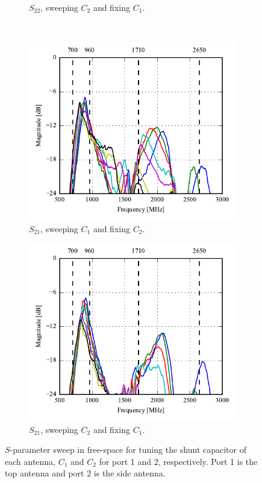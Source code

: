 \begin{figure}[htbp]
\begin{subfigure}[b]{0.49\linewidth}
        \caption{$S_{22}$, sweeping $C_2$ and fixing $C_1$.}
    \end{subfigure}
~
    \begin{subfigure}[b]{0.49\linewidth}
        \centering
        \includegraphics{img/tech_sol/monopole/prototype_v2/meas_s12_csh1}
        \caption{$S_{21}$, sweeping $C_1$ and fixing $C_2$.}
    \end{subfigure}
    \hfill
    \begin{subfigure}[b]{0.49\linewidth}
        \centering
        \includegraphics{img/tech_sol/monopole/prototype_v2/meas_s21_csh1}
        \caption{$S_{21}$, sweeping $C_2$ and fixing $C_1$.}
    \end{subfigure}
    \caption{$S$-parameter sweep in free-space for tuning the shunt capacitor of each antenna, $C_1$ and $C_2$ for port 1 and 2, respectively. Port 1 is the top antenna and port 2 is the side antenna.}
    \label{fig:sparam_mono_proto_sim_meas}
\end{figure}

